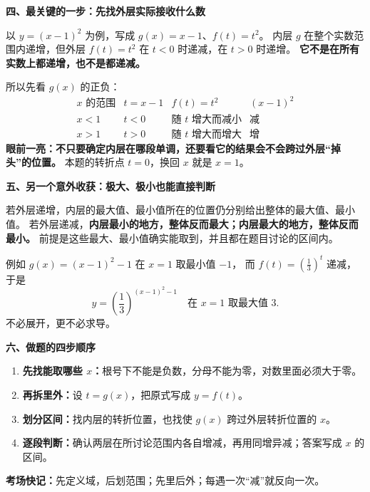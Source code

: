 \begin{explanationbox}
\textbf{\textcolor{CExplanation}{四、最关键的一步：先找外层实际接收什么数}}



以 $y=(x-1)^2$ 为例，写成 $g(x)=x-1$、$f(t)=t^2$。
内层 $g$ 在整个实数范围内递增，但外层 $f(t)=t^2$
在 $t<0$ 时递减，在 $t>0$ 时递增。
\textbf{它不是在所有实数上都递增，也不是都递减。}

所以先看 $g(x)$ 的正负：
\[
\begin{array}{c|c|c|c}
 x\text{ 的范围} & t=x-1 & f(t)=t^2 & (x-1)^2\\ \hline
 x<1 & t<0 & \text{随 }t\text{ 增大而减小} & \text{减}\\
 x>1 & t>0 & \text{随 }t\text{ 增大而增大} & \text{增}
\end{array}
\]
\textbf{眼前一亮：不只要确定内层在哪段单调，还要看它的结果会不会跨过外层“掉头”的位置。}
本题的转折点 $t=0$，换回 $x$ 就是 $x=1$。

\medskip
\end{explanationbox}
\clearpage
\begin{explanationbox}
\textbf{\textcolor{CExplanation}{五、另一个意外收获：极大、极小也能直接判断}}



若外层递增，内层的最大值、最小值所在的位置仍分别给出整体的最大值、最小值。
若外层递减，\textbf{内层最小的地方，整体反而最大；内层最大的地方，整体反而最小。}
前提是这些最大、最小值确实能取到，并且都在题目讨论的区间内。

例如 $g(x)=(x-1)^2-1$ 在 $x=1$ 取最小值 $-1$，
而 $f(t)=\left(\frac13\right)^t$ 递减，于是
\[
 y=\left(\frac13\right)^{(x-1)^2-1}
 \quad\text{在 }x=1\text{ 取最大值 }3.
\]
不必展开，更不必求导。

\medskip
\textbf{\textcolor{CExplanation}{六、做题的四步顺序}}
\begin{enumerate}[leftmargin=*, itemsep=0.35em]
\item \textbf{先找能取哪些 $x$：}根号下不能是负数，分母不能为零，对数里面必须大于零。
\item \textbf{再拆里外：}设 $t=g(x)$，把原式写成 $y=f(t)$。
\item \textbf{划分区间：}找内层的转折位置，也找使 $g(x)$ 跨过外层转折位置的 $x$。
\item \textbf{逐段判断：}确认两层在所讨论范围内各自增减，再用同增异减；答案写成 $x$ 的区间。
\end{enumerate}

\textbf{考场快记：}先定义域，后划范围；先里后外；每遇一次“减”就反向一次。
\end{explanationbox}
